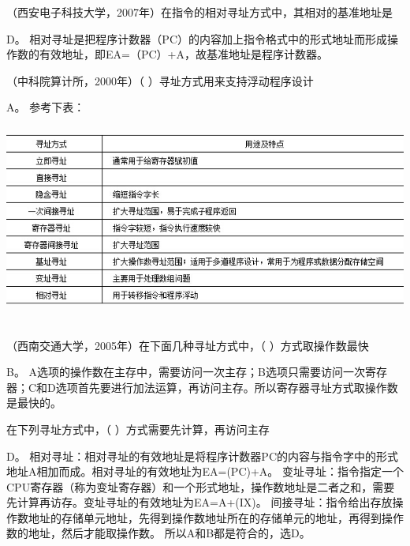 \question （西安电子科技大学，2007年）在指令的相对寻址方式中，其相对的基准地址是
\par{}
\begin{solution}D。
相对寻址是把程序计数器（PC）的内容加上指令格式中的形式地址而形成操作数的有效地址，即EA=（PC）+A，故基准地址是程序计数器。
\end{solution}
\question （中科院算计所，2000年）（ ）寻址方式用来支持浮动程序设计
\par{}
\begin{solution}A。 参考下表：
\includegraphics[width=6.40625in,height=2.73958in]{computerassets/250008b810db3ded5679f33d4628c374.jpeg}
\end{solution}
\question （西南交通大学，2005年）在下面几种寻址方式中，（ ）方式取操作数最快
\par{}
\begin{solution}B。
A选项的操作数在主存中，需要访问一次主存；B选项只需要访问一次寄存器；C和D选项首先要进行加法运算，再访问主存。所以寄存器寻址方式取操作数是最快的。
\end{solution}
\question 在下列寻址方式中，（ ）方式需要先计算，再访问主存
\par{}
\begin{solution}D。
相对寻址：相对寻址的有效地址是将程序计数器PC的内容与指令字中的形式地址A相加而成。相对寻址的有效地址为EA=(PC)+A。
变址寻址：指令指定一个CPU寄存器（称为变址寄存器）和一个形式地址，操作数地址是二者之和，需要先计算再访存。变址寻址的有效地址为EA=A+(IX)。
间接寻址：指令给出存放操作数地址的存储单元地址，先得到操作数地址所在的存储单元的地址，再得到操作数的地址，然后才能取操作数。
所以A和B都是符合的，选D。
\end{solution}
